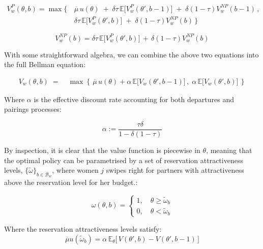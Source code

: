 \begin{equation}
    \begin{split}
    V^{P}_w(\theta,b) = \max \Big\{\, & \overline{\mu}\, u(\theta) \;+\; \delta \tau \,\mathbb{E}\Big[V^P_w(\theta', b-1)\Big] \;+\; \delta (1-\tau)V^{NP}_w(b-1)\,,\\  & \delta \tau \,\mathbb{E}\Big[ V^P_w(\theta', b)\Big] \;+\; \delta (1-\tau) V^{NP}_w(b)\, \Big\}  
    \end{split}
\end{equation} 

\begin{equation} 
        V^{NP}_w(b) = \delta \tau \,\mathbb{E}\Big[ V^P_w(\theta', b)\Big] \,+\, \delta (1-\tau) V^{NP}_w(b) 
\end{equation}

With some straightforward algebra, we can combine the above two equations into the full Bellman equation: 

\begin{equation}
    \begin{aligned} 
        V_w(\theta,b) \;=\;&\max\left\{\,\overline{\mu} \, u(\theta) +\alpha \,\mathbb{E}\Big[V_w(\theta', b-1)\Big]\,,\; \alpha\,\mathbb{E}\Big[ V_w(\theta', b)\Big]\,\right\} 
    \end{aligned}
\end{equation}

Where $\alpha$ is the effective discount rate accounting for both departures and pairings processes: 

$$
\alpha:=\frac{\tau\delta}{1-\delta(1-\tau)}
$$

By inspection, it is clear that the value function is piecewise in $\theta$, meaning that the optimal policy can be parametrised by a set of reservation attractiveness levels, $\{\tilde\omega\}_{b\in \mathcal{B}_w}$, where women $j$ swipes right for partners with attractiveness above the reservation level for her budget.:

\begin{equation*}
    \omega(\theta,b)=\begin{cases}
        1,\quad \theta\geq \widetilde{\omega}_b \\ 
        0, \quad\theta< \widetilde\omega _b  
    \end{cases} 
\end{equation*}

Where the reservation attractiveness levels satisfy: 
\begin{equation*}
    \overline\mu u(\widetilde\omega_b) = \alpha \, \mathbb{E}_\theta\Big[\,V(\theta',b)-V(\theta',b-1)\,\Big]  
\end{equation*}

